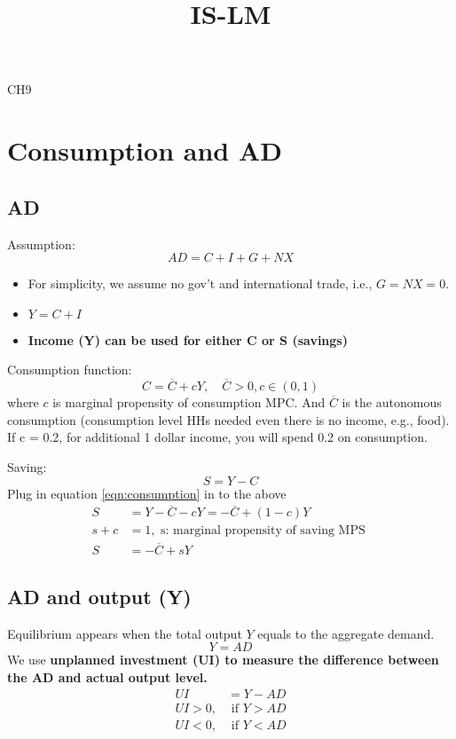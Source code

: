 \documentclass[12pt]{article}
\title{IS-LM}
\author{}
\date{}
\begin{document}
\maketitle
CH9

\section{Consumption and AD}
\subsection{AD}
Assumption:
\begin{equation*}
AD = C + I + G + NX
\end{equation*}
\begin{itemize}
\item For simplicity, we assume no gov't and international trade, i.e., 
		$ G = NX = 0 $.
\item $ Y = C + I $
\item {\textbf {Income (Y) can be used for either C or S (savings)}}
\end{itemize}


Consumption function:
\begin{equation}
C =  \overline{C} + cY, \quad  \overline{C}>0, c \in (0,1) \label{eqn:consumption}
\end{equation}
where $ c $ is marginal propensity of consumption MPC.  And $  \overline{C} $ is the
autonomous consumption (consumption level HHs needed even there is no income, e.g., 
food).
If c = 0.2, for additional 1 dollar income, you will spend 0.2 on consumption. 

Saving:
\begin{equation}
S = Y - C \label{eqn:saving}
\end{equation}
Plug in equation \eqref{eqn:consumption} in to the above
\begin{align*}
S &= Y -  \overline{C} - cY =  -  \overline{C} + (1 - c)Y\\
s + c &= 1, \text{ s: marginal propensity of saving MPS }\\
S &=  -  \overline{C} + sY
\end{align*}


\subsection{AD and output (Y)}
Equilibrium appears when the total output $ Y $ equals to the aggregate demand.
\begin{equation*}
Y = AD
\end{equation*}
We use {\textbf {unplanned investment (UI) to measure the difference between the 
AD and actual output level.}}
\begin{align*}
UI &= Y - AD\\
UI > 0, &\text{ if  }Y>AD\\
UI < 0, &\text{ if  }Y<AD\\
\end{align*}
\end{document}
